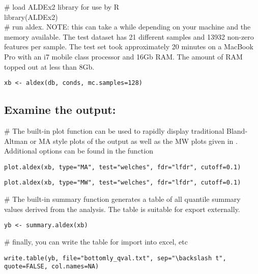 \documentclass[11pt]{amsart}
\begin{document}
\noindent \#  load ALDEx2 library for use by R\\
\noindent\textsf{library(ALDEx2)}\\


\noindent \#  run aldex. NOTE: this can take a while depending on your machine and the memory available. The test dataset  has 21 different samples and  13932 non-zero features per sample. The test set took approximately 20 minutes on a MacBook Pro with an i7 mobile class processor and 16Gb RAM. The amount of RAM topped out at less than 8Gb.  \\

\begin{verbatim}xb <- aldex(db, conds, mc.samples=128)
\end{verbatim}


\subsection*{Examine the output:}
\noindent\#  The built-in plot function can be used to rapidly display traditional Bland-Altman or MA style plots of the output as well as the MW plots given in \cite{fernandes:2013}. Additional options can be found in the function\\
\noindent\begin{verbatim}plot.aldex(xb, type="MA", test="welches", fdr="lfdr", cutoff=0.1)\end{verbatim}
\noindent\begin{verbatim}plot.aldex(xb, type="MW", test="welches", fdr="lfdr", cutoff=0.1)\end{verbatim}

\noindent\#  The built-in summary function generates a table of all quantile summary values derived from the analysis. The table is suitable for export externally. \\

\noindent\begin{verbatim}yb <- summary.aldex(xb)\end{verbatim}

\noindent\# finally, you can write the table for import into excel, etc
\begin{verbatim}write.table(yb, file="bottomly_qval.txt", sep="\backslash t", quote=FALSE, col.names=NA)\end{verbatim}
\end{document}
